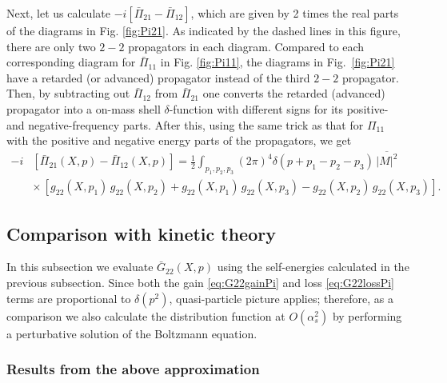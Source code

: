 \documentclass[onecolumn,showpacs,nobibnotes,nofootinbib,12pt,aps,prd,showpacs,notitlepage,nofootinbib,preprintnumbers,amsmath,amssymb]{article}
\def\fig#1{{Fig.~\ref{#1}}}
\begin{document}
Next, let us calculate $-i [\bar\Pi_{21}-\bar\Pi_{12}]$, which are
given by 2 times the real parts of the diagrams in
Fig. \ref{fig:Pi21}. As indicated by the dashed lines in this figure,
there are only two $2-2$ propagators in each diagram. Compared to each
corresponding diagram for $\bar\Pi_{11}$ in Fig. \ref{fig:Pi11}, the
diagrams in \fig{fig:Pi21} have a retarded (or advanced) propagator
instead of the third $2-2$ propagator. Then, by subtracting out
$\bar\Pi_{12}$ from $\bar\Pi_{21}$ one converts the retarded
(advanced) propagator into a on-mass shell $\delta$-function with
different signs for its positive- and negative-frequency parts. After
this, using the same trick as that for $\Pi_{11}$ with the positive
and negative energy parts of the propagators, we get
\begin{align}
  -i&[\bar\Pi_{21}(X,p)-\bar\Pi_{12}(X,p)]
  =\frac{1}{2}\int_{p_1,p_2,p_3} (2\pi)^4\delta(p+p_1-p_2-p_3) \, \overline{|M|^2}  \nonumber\\
  & \times \, \left[g_{22}(X,p_1) \, g_{22}(X,p_2) + g_{22}(X,p_1) \,
    g_{22}(X,p_3) - g_{22}(X,p_2) \, g_{22}(X,p_3) \right] .
  \label{eq:Pi21}
\end{align}

\subsection{Comparison with kinetic theory}

In this subsection we evaluate $\bar{G}_{22}(X,p)$ using the
self-energies calculated in the previous subsection. Since both the
gain \eqref{eq:G22gainPi} and loss \eqref{eq:G22lossPi} terms are
proportional to $\delta(p^2)$, quasi-particle picture applies;
therefore, as a comparison we also calculate the distribution function
at $O(\alpha_s^2)$ by performing a perturbative solution of the
Boltzmann equation.

\subsubsection{Results from the above approximation}
\label{sec:results}
\end{document}
